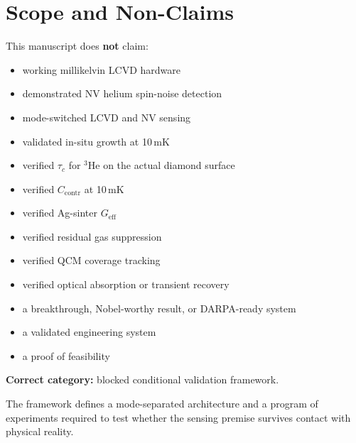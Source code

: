 \documentclass[12pt,a4paper]{article}
\newcommand{\blocked}{\textsc{blocked}}
\newcommand{\conditional}{\textsc{conditional}}
\newcommand{\derivedcheck}{\textsc{derived\_check}}
\newcommand{\unknown}{\textsc{unknown}}
\begin{document}
\begin{abstract}
Gate counts: 0~\textsc{Pass} $|$ 39~\conditional{} $|$ 0~\textsc{Fail}
$|$ 2~\unknown{} $|$ 21~\blocked{} $|$ 1~\derivedcheck{} (D9, gas kinetics).
\medskip

\noindent\textbf{Canonical gate-table summary (single source of truth, generated by
\texttt{qta\_full\_sim.py}):} 63 total gates --- 0 PASS, 39 CONDITIONAL, 21 BLOCKED,
2 UNKNOWN, 1 DERIVED\_CHECK. Canonical $\tau_c$ threshold: 292\,$\mu$s (v3.3). The
27.728\,$\mu$s value (v3.0) is SUPERSEDED, NOT\_CANONICAL, NOT\_LIVE\_GATE\_LOGIC.

\end{abstract}

\section{Scope and Non-Claims}
\label{sec:nonclaims}

This manuscript does \textbf{not} claim:
\begin{itemize}[noitemsep]
  \item working millikelvin LCVD hardware
  \item demonstrated NV helium spin-noise detection
  \item mode-switched LCVD and NV sensing
  \item validated in-situ growth at 10\,mK
  \item verified $\tau_c$ for $^3$He on the actual diamond surface
  \item verified $C_\mathrm{contr}$ at 10\,mK
  \item verified Ag-sinter $G_\mathrm{eff}$
  \item verified residual gas suppression
  \item verified QCM coverage tracking
  \item verified optical absorption or transient recovery
  \item a breakthrough, Nobel-worthy result, or DARPA-ready system
  \item a validated engineering system
  \item a proof of feasibility
\end{itemize}

\textbf{Correct category:} blocked conditional validation framework.

The framework defines a mode-separated architecture and a program of
experiments required to test whether the sensing premise survives contact with
physical reality.
\end{document}

